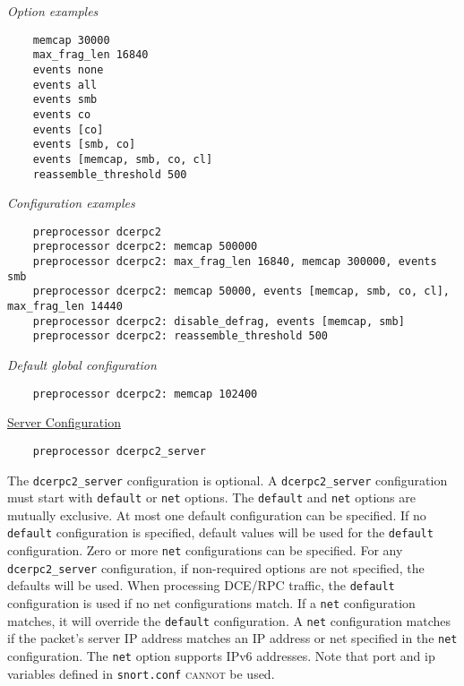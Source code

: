 \documentclass[english]{report}
\begin{document}
\textit{Option examples}
\footnotesize
\begin{verbatim}
    memcap 30000
    max_frag_len 16840
    events none
    events all
    events smb
    events co
    events [co]
    events [smb, co]
    events [memcap, smb, co, cl]
    reassemble_threshold 500
\end{verbatim}
\normalsize

\textit{Configuration examples}
\footnotesize
\begin{verbatim}
    preprocessor dcerpc2
    preprocessor dcerpc2: memcap 500000
    preprocessor dcerpc2: max_frag_len 16840, memcap 300000, events smb
    preprocessor dcerpc2: memcap 50000, events [memcap, smb, co, cl], max_frag_len 14440
    preprocessor dcerpc2: disable_defrag, events [memcap, smb]
    preprocessor dcerpc2: reassemble_threshold 500
\end{verbatim}
\normalsize

\textit{Default global configuration}
\footnotesize
\begin{verbatim}
    preprocessor dcerpc2: memcap 102400
\end{verbatim}
\normalsize

\underline{Server Configuration}

\begin{verbatim}
    preprocessor dcerpc2_server
\end{verbatim}

The \texttt{dcerpc2\_server} configuration is optional.  A
\texttt{dcerpc2\_server} configuration must start with \texttt{default} or
\texttt{net} options.  The \texttt{default} and \texttt{net} options are
mutually exclusive.  At most one default configuration can be specified. If no
\texttt{default} configuration is specified, default values will be used for
the \texttt{default} configuration.  Zero or more \texttt{net} configurations
can be specified.  For any \texttt{dcerpc2\_server} configuration, if
non-required options are not specified, the defaults will be used.  When
processing DCE/RPC traffic, the \texttt{default} configuration is used if no
net configurations match.  If a \texttt{net} configuration matches, it will
override the \texttt{default} configuration. A \texttt{net} configuration
matches if the packet's server IP address matches an IP address or net
specified in the \texttt{net} configuration.  The \texttt{net} option supports
IPv6 addresses.  Note that port and ip variables defined in \texttt{snort.conf}
\textsc{cannot} be used.
\end{document}
